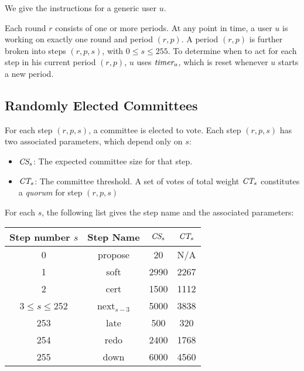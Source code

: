 \documentclass[../main.tex]{subfiles}
\begin{document}
We give the instructions for a generic user $u$.

Each round $r$ consists of one or more periods. 
At any point in time, a user $u$ is working on exactly one round and period $(r,p)$.  
A period $(r,p)$ is further broken into steps $(r,p,s)$, with $0\leq s \leq 255$. 
To determine when to act for each step in his current period $(r,p)$, $u$ uses $\textit{timer}_u$, 
which is reset whenever $u$ starts a new period.

\subsection{Randomly Elected Committees}

For each step $(r,p,s)$, a committee is elected to vote. Each step $(r,p,s)$ has two associated parameters, which depend only on $s$:
\begin{itemize}
    \item $\textit{\textit{CS}}_s$: The expected committee size for that step.
    \item $\textit{\textit{CT}}_s$: The committee threshold. A set of votes of total weight $\textit{\textit{CT}}_s$ constitutes a \textit{quorum} for step $(r,p,s)$
\end{itemize}
For each $s$, the following list gives the step name and the associated parameters:

\begin{center}
\begin{tabular}{ |c|c|c|c| } 
 \hline
 Step number $s$ & Step Name & $\textit{CS}_s$ & $\textit{CT}_s$ \\
 \hline
 0 & propose & 20 & N/A \\ 
 1 & soft & 2990 & 2267 \\ 
 2 & cert & 1500 & 1112 \\ 
 3$\leq s \leq$252 & next$_{s-3}$ & 5000 & 3838 \\ 
 253 & late & 500 & 320 \\ 
 254 & redo & 2400 & 1768 \\ 
 255 & down & 6000 & 4560 \\ 
 \hline
\end{tabular}
\end{center}
\end{document}

